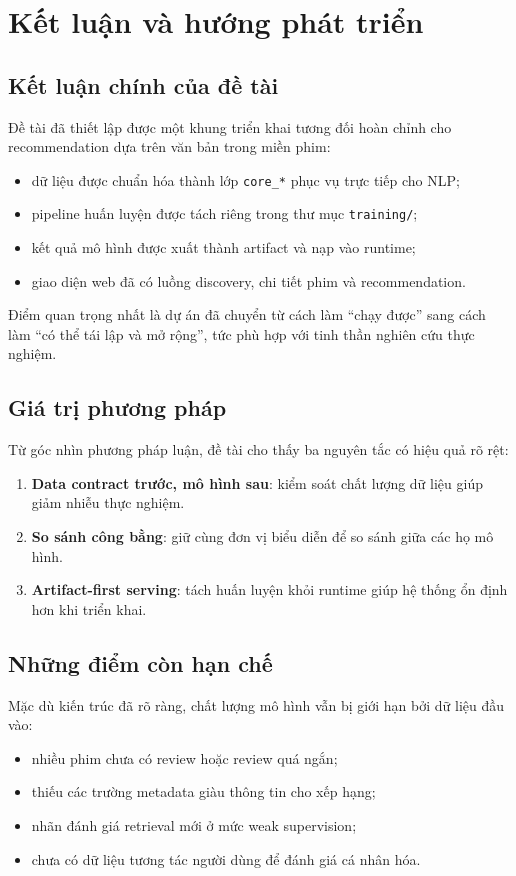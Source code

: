 \chapter{Kết luận và hướng phát triển}

\section{Kết luận chính của đề tài}
Đề tài đã thiết lập được một khung triển khai tương đối hoàn chỉnh cho recommendation dựa trên văn bản trong miền phim:
\begin{itemize}
    \item dữ liệu được chuẩn hóa thành lớp \texttt{core\_*} phục vụ trực tiếp cho NLP;
    \item pipeline huấn luyện được tách riêng trong thư mục \texttt{training/};
    \item kết quả mô hình được xuất thành artifact và nạp vào runtime;
    \item giao diện web đã có luồng discovery, chi tiết phim và recommendation.
\end{itemize}

Điểm quan trọng nhất là dự án đã chuyển từ cách làm ``chạy được'' sang cách làm ``có thể tái lập và mở rộng'', tức phù hợp với tinh thần nghiên cứu thực nghiệm.

\section{Giá trị phương pháp}
Từ góc nhìn phương pháp luận, đề tài cho thấy ba nguyên tắc có hiệu quả rõ rệt:
\begin{enumerate}[label=\arabic*.]
    \item \textbf{Data contract trước, mô hình sau}: kiểm soát chất lượng dữ liệu giúp giảm nhiễu thực nghiệm.
    \item \textbf{So sánh công bằng}: giữ cùng đơn vị biểu diễn để so sánh giữa các họ mô hình.
    \item \textbf{Artifact-first serving}: tách huấn luyện khỏi runtime giúp hệ thống ổn định hơn khi triển khai.
\end{enumerate}

\section{Những điểm còn hạn chế}
Mặc dù kiến trúc đã rõ ràng, chất lượng mô hình vẫn bị giới hạn bởi dữ liệu đầu vào:
\begin{itemize}
    \item nhiều phim chưa có review hoặc review quá ngắn;
    \item thiếu các trường metadata giàu thông tin cho xếp hạng;
    \item nhãn đánh giá retrieval mới ở mức weak supervision;
    \item chưa có dữ liệu tương tác người dùng để đánh giá cá nhân hóa.
\end{itemize}

